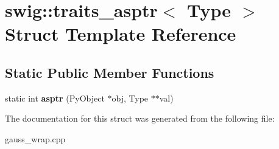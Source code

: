 \hypertarget{structswig_1_1traits__asptr}{\section{swig\-:\-:traits\-\_\-asptr$<$ Type $>$ Struct Template Reference}
\label{structswig_1_1traits__asptr}
}
\subsection*{Static Public Member Functions}
\begin{DoxyCompactItemize}
\item 
\hypertarget{structswig_1_1traits__asptr_aa24007f1d4126e9a4162bce7bf231931}{static int {\bfseries asptr} (Py\-Object $\ast$obj, Type $\ast$$\ast$val)}\label{structswig_1_1traits__asptr_aa24007f1d4126e9a4162bce7bf231931}

\end{DoxyCompactItemize}


The documentation for this struct was generated from the following file\-:\begin{DoxyCompactItemize}
\item 
gauss\-\_\-wrap.\-cpp\end{DoxyCompactItemize}
